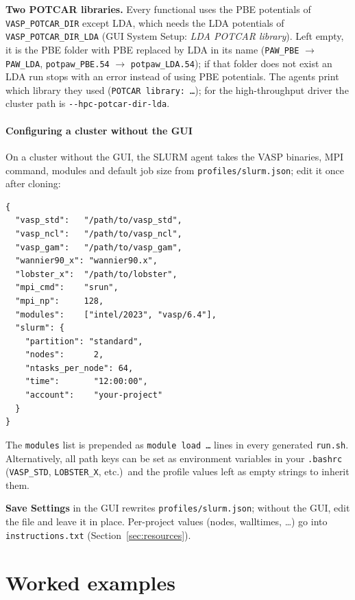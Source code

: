 \documentclass[11pt,a4paper]{scrartcl}
\begin{document}
\noindent\textbf{Two POTCAR libraries.}  Every functional uses the PBE potentials of
\texttt{VASP\_POTCAR\_DIR} except LDA, which needs the LDA potentials of
\texttt{VASP\_POTCAR\_DIR\_LDA} (GUI System Setup: \emph{LDA POTCAR library}).  Left
empty, it is the PBE folder with PBE replaced by LDA in its name (\texttt{PAW\_PBE}
$\to$ \texttt{PAW\_LDA}, \texttt{potpaw\_PBE.54} $\to$ \texttt{potpaw\_LDA.54}); if that
folder does not exist an LDA run stops with an error instead of using PBE potentials.  The
agents print which library they used (\texttt{POTCAR library: \ldots}); for the
high-throughput driver the cluster path is \texttt{-{}-hpc-potcar-dir-lda}.


\subsection{Configuring a cluster without the GUI}
\label{sec:remote-setup}

On a cluster without the GUI, the SLURM agent takes the VASP binaries, MPI command, modules
and default job size from \texttt{profiles/slurm.json}; edit it once after cloning:

\begin{lstlisting}[basicstyle=\ttfamily\small]
{
  "vasp_std":   "/path/to/vasp_std",
  "vasp_ncl":   "/path/to/vasp_ncl",
  "vasp_gam":   "/path/to/vasp_gam",
  "wannier90_x": "wannier90.x",
  "lobster_x":  "/path/to/lobster",
  "mpi_cmd":    "srun",
  "mpi_np":     128,
  "modules":    ["intel/2023", "vasp/6.4"],
  "slurm": {
    "partition": "standard",
    "nodes":      2,
    "ntasks_per_node": 64,
    "time":       "12:00:00",
    "account":    "your-project"
  }
}
\end{lstlisting}

\noindent The \texttt{modules} list is prepended as \texttt{module load \ldots}
lines in every generated \texttt{run.sh}.  Alternatively, all path keys can be
set as environment variables in your \texttt{.bashrc}
(\texttt{VASP\_STD}, \texttt{LOBSTER\_X}, etc.)\ and the profile values left
as empty strings to inherit them.

\noindent \textbf{Save Settings} in the GUI rewrites \texttt{profiles/slurm.json}; without the
GUI, edit the file and leave it in place.  Per-project values (nodes, walltimes, \ldots) go into
\texttt{instructions.txt} (Section~\ref{sec:resources}).

\part{Worked examples}
\label{part:examples}
\end{document}
